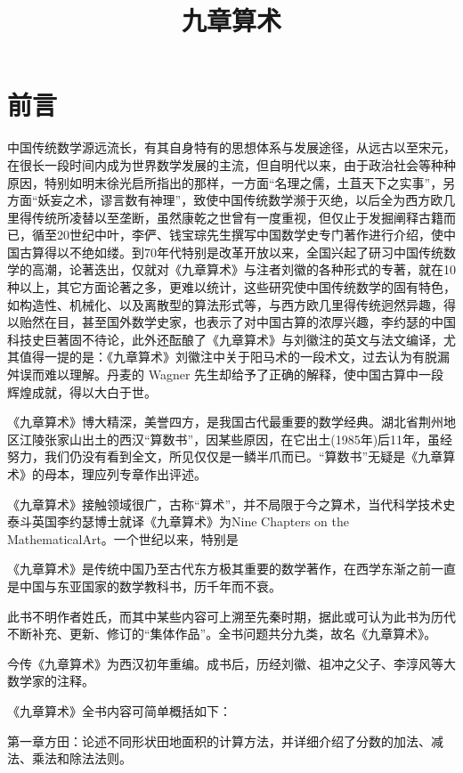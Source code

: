\documentclass[12pt,UTF8]{ctexbook}
\title{\heiti\zihao{0} 九章算术}
\author{}
\date{}
\begin{document}
\maketitle
\tableofcontents

\frontmatter
\chapter{前言}

中国传统数学源远流长，有其自身特有的思想体系与发展途径，从远古以至宋元，在很长一段时间内成为世界数学发展的主流，但自明代以来，由于政治社会等种种原因，特别如明末徐光启所指出的那样，一方面“名理之儒，土苴天下之实事”，另方面“妖妄之术，谬言数有神理”，致使中国传统数学濒于灭绝，以后全为西方欧几里得传统所凌替以至垄断，虽然康乾之世曾有一度重视，但仅止于发掘阐释古籍而已，循至20世纪中叶，李俨、钱宝琮先生撰写中国数学史专门著作进行介绍，使中国古算得以不绝如缕。到70年代特别是改革开放以来，全国兴起了研习中国传统数学的高潮，论著迭出，仅就对《九章算术》与注者刘徽的各种形式的专著，就在10种以上，其它方面论著之多，更难以统计，这些研究使中国传统数学的固有特色，如构造性、机械化、以及离散型的算法形式等，与西方欧几里得传统迥然异趣，得以贻然在目，甚至国外数学史家，也表示了对中国古算的浓厚兴趣，李约瑟的中国科技史巨著固不待论，此外还酝酿了《九章算术》与刘徽注的英文与法文编译，尤其值得一提的是：《九章算术》刘徽注中关于阳马术的一段术文，过去认为有脱漏舛误而难以理解。丹麦的 Wagner 先生却给予了正确的解释，使中国古算中一段辉煌成就，得以大白于世。

《九章算术》博大精深，美誉四方，是我国古代最重要的数学经典。湖北省荆州地区江陵张家山出土的西汉“算数书”，因某些原因，在它出土(1985年)后11年，虽经努力，我们仍没有看到全文，所见仅仅是一鳞半爪而已。“算数书”无疑是《九章算术》的母本，理应列专章作出评述。

《九章算术》接触领域很广，古称“算术”，并不局限于今之算术，当代科学技术史泰斗英国李约瑟博士就译《九章算术》为Nine Chapters on the MathematicalArt。一个世纪以来，特别是

《九章算术》是传统中国乃至古代东方极其重要的数学著作，在西学东渐之前一直是中国与东亚国家的数学教科书，历千年而不衰。

此书不明作者姓氏，而其中某些内容可上溯至先秦时期，据此或可认为此书为历代不断补充、更新、修订的“集体作品”。全书问题共分九类，故名《九章算术》。

今传《九章算术》为西汉初年重编。成书后，历经刘徽、祖冲之父子、李淳风等大数学家的注释。

《九章算术》全书内容可简单概括如下：

第一章方田：论述不同形状田地面积的计算方法，并详细介绍了分数的加法、减法、乘法和除法法则。
\end{document}
